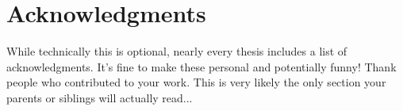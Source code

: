 \chapter*{Acknowledgments}
While technically this is optional, nearly every thesis includes a list of acknowledgments. It's fine to make these personal and potentially funny! Thank people who contributed to your work. This is very likely the only section your parents or siblings will actually read... 